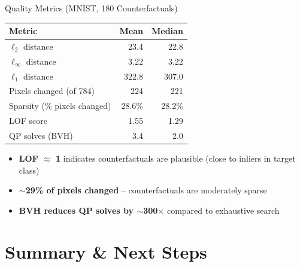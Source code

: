 \documentclass[aspectratio=169, 10pt]{beamer}
\begin{document}
\begin{frame}{Quality Metrics (MNIST, 180 Counterfactuals)}

\begin{center}
\begin{tabular}{lrr}
  \toprule
  \textbf{Metric} & \textbf{Mean} & \textbf{Median} \\
  \midrule
  $\ell_2$ distance           & 23.4  & 22.8  \\
  $\ell_\infty$ distance      & 3.22  & 3.22  \\
  $\ell_1$ distance           & 322.8 & 307.0 \\
  Pixels changed (of 784)     & 224   & 221   \\
  Sparsity (\% pixels changed)& 28.6\%& 28.2\% \\
  LOF score                   & 1.55  & 1.29  \\
  QP solves (BVH)             & 3.4   & 2.0   \\
  \bottomrule
\end{tabular}
\end{center}

\bigskip

\begin{itemize}
  \item \textbf{LOF $\approx$ 1} indicates counterfactuals are plausible (close to inliers in target class)
  \item \textbf{$\sim$29\% of pixels changed} -- counterfactuals are moderately sparse
  \item \textbf{BVH reduces QP solves by $\sim$300$\times$} compared to exhaustive search
\end{itemize}

\end{frame}

\section{Summary \& Next Steps}
\end{document}

